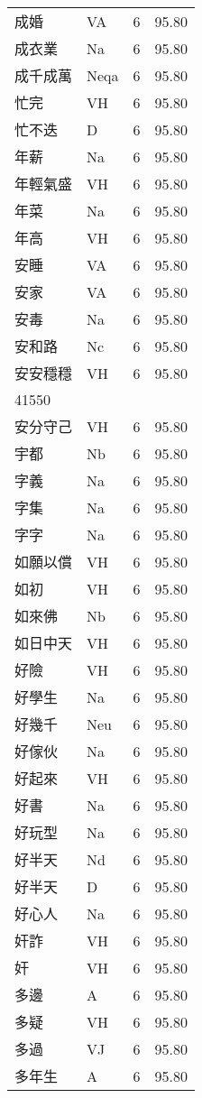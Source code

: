 \documentclass[twocolumn]{book}
\begin{document}
\begin{supertabular}{llrr}
成婚 & VA & 6 &  95.80\\
成衣業 & Na & 6 &  95.80\\
成千成萬 & Neqa & 6 &  95.80\\
忙完 & VH & 6 &  95.80\\
忙不迭 & D & 6 &  95.80\\
年薪 & Na & 6 &  95.80\\
年輕氣盛 & VH & 6 &  95.80\\
年菜 & Na & 6 &  95.80\\
年高 & VH & 6 &  95.80\\
安睡 & VA & 6 &  95.80\\
安家 & VA & 6 &  95.80\\
安毒 & Na & 6 &  95.80\\
安和路 & Nc & 6 &  95.80\\
安安穩穩 & VH & 6 &  95.80\\
41550\\
安分守己 & VH & 6 &  95.80\\
宇都 & Nb & 6 &  95.80\\
字義 & Na & 6 &  95.80\\
字集 & Na & 6 &  95.80\\
字字 & Na & 6 &  95.80\\
如願以償 & VH & 6 &  95.80\\
如初 & VH & 6 &  95.80\\
如來佛 & Nb & 6 &  95.80\\
如日中天 & VH & 6 &  95.80\\
好險 & VH & 6 &  95.80\\
好學生 & Na & 6 &  95.80\\
好幾千 & Neu & 6 &  95.80\\
好傢伙 & Na & 6 &  95.80\\
好起來 & VH & 6 &  95.80\\
好書 & Na & 6 &  95.80\\
好玩型 & Na & 6 &  95.80\\
好半天 & Nd & 6 &  95.80\\
好半天 & D & 6 &  95.80\\
好心人 & Na & 6 &  95.80\\
奸詐 & VH & 6 &  95.80\\
奸 & VH & 6 &  95.80\\
多邊 & A & 6 &  95.80\\
多疑 & VH & 6 &  95.80\\
多過 & VJ & 6 &  95.80\\
多年生 & A & 6 &  95.80\\

\end{supertabular}
\end{document}
